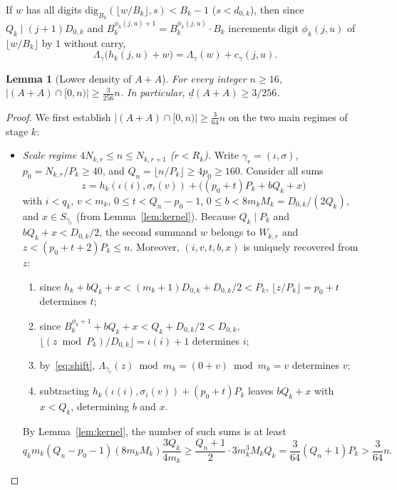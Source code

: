 \documentclass[11pt,a4paper]{amsart}
\newtheorem{lemma}{Lemma}
\theoremstyle{remark}
\newcommand{\ld}{\underline{d}}
\begin{document}
If $w$ has all digits $\mathrm{dig}_{B_k}(\lfloor w / B_k \rfloor, s) < B_k - 1$ ($s < d_{0,k}$), then since $Q_k \mid (j + 1) D_{0,k}$ and $B_k^{\phi_k(j, u) + 1} = B_k^{\phi_k(j, u)} \cdot B_k$ increments digit $\phi_k(j, u)$ of $\lfloor w / B_k \rfloor$ by $1$ without carry,
\begin{equation}\label{eq:shift}
\Lambda_\gamma\bigl(h_k(j, u) + w\bigr) = \Lambda_\gamma(w) + c_\gamma(j, u).
\end{equation}

\begin{lemma}[Lower density of $A + A$]\label{lem:pos-ld}
For every integer $n \ge 16$, $|(A + A) \cap [0, n)| \ge \frac{3}{256} n$. In particular, $\ld(A + A) \ge 3 / 256$.
\end{lemma}

\begin{proof}
We first establish $|(A + A) \cap [0, n)| \ge \frac{3}{64} n$ on the two main regimes of stage $k$:
\begin{itemize}
\item \emph{Scale regime $4 N_{k,r} \le n \le N_{k,r+1}$ ($r < R_k$).} Write $\gamma_r = (\iota, \sigma)$, $p_0 = N_{k,r} / P_k \ge 40$, and $Q_n = \lfloor n / P_k \rfloor \ge 4 p_0 \ge 160$. Consider all sums
\[
z = h_k(\iota(i), \sigma_i(v)) + \bigl((p_0 + t) P_k + b Q_k + x\bigr)
\]
with $i < q_k$, $v < m_k$, $0 \le t < Q_n - p_0 - 1$, $0 \le b < 8 m_k M_k = D_{0,k} / (2 Q_k)$, and $x \in S_{\gamma_r}$ (from Lemma~\ref{lem:kernel}). Because $Q_k \mid P_k$ and $b Q_k + x < D_{0,k} / 2$, the second summand $w$ belongs to $W_{k,r}$ and $z < (p_0 + t + 2) P_k \le n$. Moreover, $(i, v, t, b, x)$ is uniquely recovered from $z$:
\begin{enumerate}
\item since $h_k + b Q_k + x < (m_k + 1) D_{0,k} + D_{0,k} / 2 < P_k$, $\lfloor z / P_k \rfloor = p_0 + t$ determines $t$;
\item since $B_k^{\phi_k + 1} + b Q_k + x < Q_k + D_{0,k} / 2 < D_{0,k}$, $\lfloor (z \bmod P_k) / D_{0,k} \rfloor = \iota(i) + 1$ determines $i$;
\item by~\eqref{eq:shift}, $\Lambda_{\gamma_r}(z) \bmod m_k = (0 + v) \bmod m_k = v$ determines $v$;
\item subtracting $h_k(\iota(i), \sigma_i(v)) + (p_0 + t) P_k$ leaves $b Q_k + x$ with $x < Q_k$, determining $b$ and $x$.
\end{enumerate}
By Lemma~\ref{lem:kernel}, the number of such sums is at least
\[
q_k m_k (Q_n - p_0 - 1)(8 m_k M_k) \frac{3 Q_k}{4 m_k} \ge \frac{Q_n + 1}{2} \cdot 3 m_k^3 M_k Q_k = \frac{3}{64} (Q_n + 1) P_k > \frac{3}{64} n.
\]
\end{itemize}
\end{proof}
\end{document}
